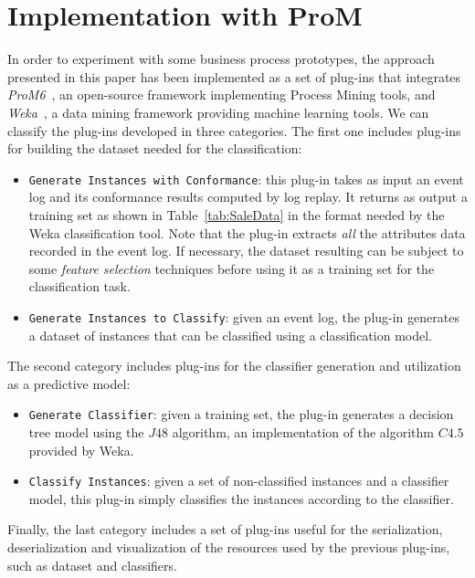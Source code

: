 \documentclass{llncs}
\begin{document}
{

\section{Implementation with ProM}\label{implementation}
In order to experiment with some business process prototypes, the approach presented in this paper has been implemented as a set of plug-ins that integrates \emph{ProM6}~\cite{DBLP:conf/bpm/AalstDGRVW09}, an open-source framework implementing Process Mining tools, and \emph{Weka}~\cite{DBLP:journals/sigkdd/HallFHPRW09}, a data mining framework providing machine learning tools.
We can classify the plug-ins developed in three categories. The first one includes plug-ins for building the dataset needed for the classification:
\begin{itemize}
\item \texttt{Generate Instances with Conformance}: this plug-in takes as input an event log and its conformance results computed by log replay. It returns as output a training set as shown in Table~\ref{tab:SaleData} in the format needed by the Weka classification tool. Note that the plug-in extracts \emph{all} the attributes data recorded in the event log. If necessary, the dataset resulting can be subject to some \emph{feature selection} techniques before using it as a training set for the classification task.  

\item \texttt{Generate Instances to Classify}: given an event log, the plug-in generates a dataset of instances that can be classified using a classification model.
\end{itemize}
The second category includes plug-ins for the classifier generation and utilization as a predictive model:
\begin{itemize}
\item \texttt{Generate Classifier}: given a training set, the plug-in generates a decision tree model using the $J48$ algorithm, an implementation of the algorithm $C4.5$ provided by Weka.
\item \texttt{Classify Instances}: given a set of non-classified instances and a classifier model, this plug-in simply classifies the instances according to the classifier.
\end{itemize}
Finally, the last category includes a set of plug-ins useful for the serialization, deserialization and visualization of the resources used by the previous plug-ins, such as dataset and classifiers. 

}
\end{document}
